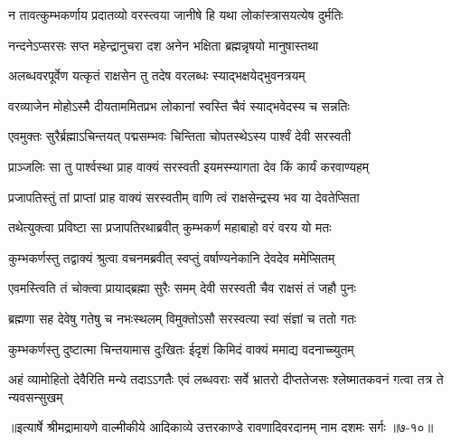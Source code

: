 \twolineshloka
{न तावत्कुम्भकर्णाय प्रदातव्यो वरस्त्वया}
{जानीषे हि यथा लोकांस्त्रासयत्येष दुर्मतिः} %

\twolineshloka
{नन्दनेऽप्सरसः सप्त महेन्द्रानुचरा दश}
{अनेन भक्षिता ब्रह्मन्नृषयो मानुषास्तथा} %

\twolineshloka
{अलब्धवरपूर्वेण यत्कृतं राक्षसेन तु}
{तदेष वरलब्धः स्याद्भक्षयेद्भुवनत्रयम्} %

\twolineshloka
{वरव्याजेन मोहोऽस्मै दीयताममितप्रभ}
{लोकानां स्वस्ति चैवं स्याद्भवेदस्य च सन्नतिः} %

\twolineshloka
{एवमुक्तः सुरैर्ब्रह्माऽचिन्तयत् पद्मसम्भवः}
{चिन्तिता चोपतस्थेऽस्य पार्श्वं देवी सरस्वती} %

\twolineshloka
{प्राञ्जलिः सा तु पार्श्वस्था प्राह वाक्यं सरस्वती}
{इयमस्म्यागता देव किं कार्यं करवाण्यहम्} %

\twolineshloka
{प्रजापतिस्तुं तां प्राप्तां प्राह वाक्यं सरस्वतीम्}
{वाणि त्वं राक्षसेन्द्रस्य भव या देवतेप्सिता} %

\twolineshloka
{तथेत्युक्त्वा प्रविष्टा सा प्रजापतिरथाब्रवीत्}
{कुम्भकर्ण महाबाहो वरं वरय यो मतः} %

\twolineshloka
{कुम्भकर्णस्तु तद्वाक्यं श्रुत्वा वचनमब्रवीत्}
{स्वप्तुं वर्षाण्यनेकानि देवदेव ममेप्सितम्} %

\twolineshloka
{एवमस्त्विति तं चोक्त्वा प्रायाद्ब्रह्मा सुरैः समम्}
{देवी सरस्वती चैव राक्षसं तं जहौ पुनः} %

\twolineshloka
{ब्रह्मणा सह देवेषु गतेषु च नभःस्थलम्}
{विमुक्तोऽसौ सरस्वत्या स्वां संज्ञां च ततो गतः} %

\twolineshloka
{कुम्भकर्णस्तु दुष्टात्मा चिन्तयामास दुःखितः}
{ईदृशं किमिदं वाक्यं ममाद्य वदनाच्च्युतम्} %

\threelineshloka
{अहं व्यामोहितो देवैरिति मन्ये तदाऽऽगतैः}
{एवं लब्धवराः सर्वे भ्रातरो दीप्ततेजसः}
{श्लेष्मातकवनं गत्वा तत्र ते न्यवसन्सुखम्} %


॥इत्यार्षे श्रीमद्रामायणे वाल्मीकीये आदिकाव्ये उत्तरकाण्डे रावणादिवरदानम् नाम दशमः सर्गः ॥७-१०॥
